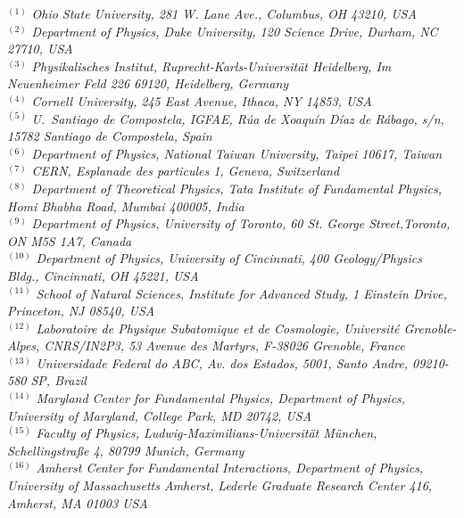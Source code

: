 {\footnotesize
\begin{center}
$^{(1)}$ \emph{Ohio State University, 281 W. Lane Ave., Columbus, OH 43210, USA}\\
$^{(2)}$ \emph{Department of Physics, Duke University, 120 Science Drive, Durham, NC 27710, USA}\\
$^{(3)}$ \emph{Physikalisches Institut, Ruprecht-Karls-Universit\"at Heidelberg, Im Neuenheimer Feld 226 69120, Heidelberg, Germany}\\
$^{(4)}$ \emph{Cornell University, 245 East Avenue, Ithaca, NY 14853, USA}\\
$^{(5)}$ \emph{U.~Santiago de Compostela, IGFAE, R\'ua de Xoaqu\'in D\'iaz de R\'abago, s/n, 15782 Santiago de Compostela, Spain}\\
$^{(6)}$ \emph{Department of Physics, National Taiwan University, Taipei 10617, Taiwan}\\
$^{(7)}$ \emph{CERN, Esplanade des particules 1, Geneva,  Switzerland}\\
$^{(8)}$ \emph{Department of Theoretical Physics, Tata Institute of Fundamental Physics,  Homi Bhabha Road, Mumbai 400005, India}\\
$^{(9)}$ \emph{Department of Physics, University of Toronto, 60 St. George Street,Toronto, ON M5S 1A7, Canada}\\
$^{(10)}$ \emph{Department of Physics, University of Cincinnati, 400 Geology/Physics Bldg., Cincinnati, OH 45221, USA}\\
$^{(11)}$ \emph{School of Natural Sciences, Institute for Advanced Study, 1 Einstein Drive, Princeton, NJ 08540, USA}\\
$^{(12)}$ \emph{Laboratoire de Physique Subatomique et de Cosmologie, Universit\'e   Grenoble-Alpes, CNRS/IN2P3, 53 Avenue des Martyrs, F-38026 Grenoble, France}\\
$^{(13)}$ \emph{Universidade Federal do ABC, Av. dos Estados, 5001, Santo Andre, 09210-580 SP, Brazil}\\
$^{(14)}$ \emph{Maryland Center for Fundamental Physics,  Department of Physics, University of Maryland, College Park, MD 20742, USA}\\
$^{(15)}$ \emph{Faculty of Physics, Ludwig-Maximilians-Universit\"at M\"unchen, Schellingstra\ss e 4, 80799 Munich, Germany}\\
$^{(16)}$ \emph{Amherst Center for Fundamental Interactions, Department of Physics, University of Massachusetts Amherst, Lederle Graduate Research Center 416, Amherst, MA 01003 USA}\\

\end{center}}

